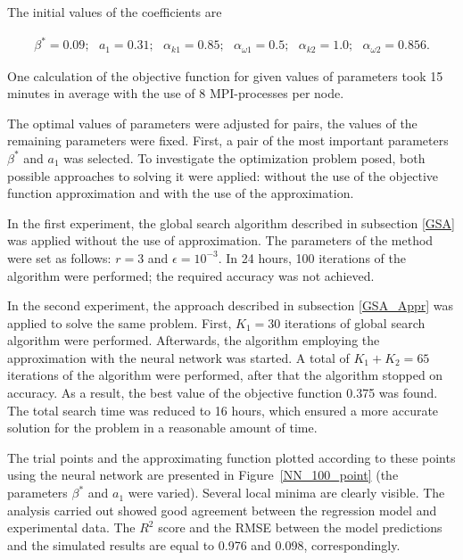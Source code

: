 \documentclass[mathematics,article,submit,pdftex,moreauthors]{Definitions/mdpi}
\begin{document}
The initial values of the coefficients are

\begin{linenomath}
\begin{equation}
	\begin{aligned}
		\beta^* = 0.09;\ \ \ a_1 = 0.31;\ \ \ \alpha_{k 1} = 0.85;\ \ \ \alpha_{\omega 1} = 0.5; \ \ \ \alpha_{k 2} = 1.0;\ \ \ \alpha_{\omega 2} = 0.856.
	\end{aligned}
\end{equation}
\end{linenomath}

One calculation of the objective function for given values of parameters took 15 minutes in average with the use of 8 MPI-processes per node. 

The optimal values of parameters were adjusted for pairs, the values of the remaining parameters were fixed. 
First, a pair of the most important parameters $\beta^*$ and $a_1$ was selected. 
To investigate the optimization problem posed, both possible approaches to solving it were applied: without the use of the objective function approximation  and with the use of the approximation.

In the first experiment, the global search algorithm described in subsection \ref{GSA} was applied without the use of approximation. 
The parameters of the method were set as follows: $r = 3$ and $\epsilon = 10^{-3}$. 
In 24 hours, 100 iterations of the algorithm were performed; the required accuracy was not achieved. 

In the second experiment, the approach described in subsection \ref{GSA_Appr} was applied to solve the same problem.
First, $K_1 = 30$ iterations of global search algorithm were performed. 
Afterwards, the algorithm employing the approximation with the neural network was started. 
A total of $K_1 + K_2 = 65$ iterations of the algorithm were performed, after that the algorithm stopped on accuracy. 
As a result, the best value  of the objective function 0.375 was found. 
The total search time was reduced to 16 hours, which ensured a more accurate solution for the problem in a reasonable amount of time.

The trial points and the approximating function plotted according to these points using the neural network are presented in Figure~\ref{NN_100_point} (the parameters $\beta^*$ and $a_1$ were varied). Several local minima are clearly visible.
The analysis carried out showed good agreement between the regression model and experimental data.
The $R^2$ score and the RMSE between the model predictions and the simulated results are equal to 0.976 and 0.098, correspondingly.
\end{document}

